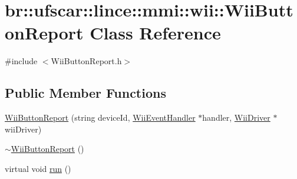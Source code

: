 \hypertarget{classbr_1_1ufscar_1_1lince_1_1mmi_1_1wii_1_1WiiButtonReport}{
\section{br::ufscar::lince::mmi::wii::WiiButtonReport Class Reference}
\label{classbr_1_1ufscar_1_1lince_1_1mmi_1_1wii_1_1WiiButtonReport}
}


{\ttfamily \#include $<$WiiButtonReport.h$>$}

\subsection*{Public Member Functions}
\begin{DoxyCompactItemize}
\item 
\hyperlink{classbr_1_1ufscar_1_1lince_1_1mmi_1_1wii_1_1WiiButtonReport_a7e958fef164118ccacbe8cd4eb7d3708}{WiiButtonReport} (string deviceId, \hyperlink{classbr_1_1ufscar_1_1lince_1_1mmi_1_1wii_1_1WiiEventHandler}{WiiEventHandler} $\ast$handler, \hyperlink{classbr_1_1ufscar_1_1lince_1_1mmi_1_1wii_1_1WiiDriver}{WiiDriver} $\ast$wiiDriver)
\item 
\hyperlink{classbr_1_1ufscar_1_1lince_1_1mmi_1_1wii_1_1WiiButtonReport_a381456e6d72e3bf8503af0be300c7087}{$\sim$WiiButtonReport} ()
\item 
virtual void \hyperlink{classbr_1_1ufscar_1_1lince_1_1mmi_1_1wii_1_1WiiButtonReport_a18c5cdabeb267b938b289249cb134016}{run} ()
\end{DoxyCompactItemize}


